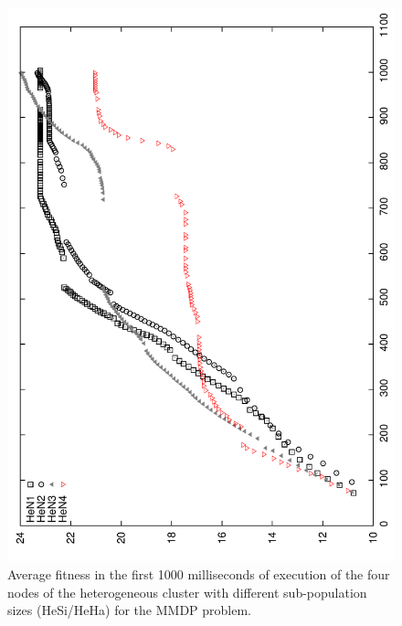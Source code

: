 \begin{figure}
\centering
 \includegraphics[angle=-90,scale =0.4] {gfx/adaptiveresults/generationsMMDPheterosize.pdf}
\caption{Average fitness in the first 1000 milliseconds of execution
  of the four nodes of the heterogeneous cluster with different
  sub-po\-pu\-la\-tion sizes (HeSi/HeHa) for the MMDP problem.} %
\label{fig:hesiheha}
\end{figure}

